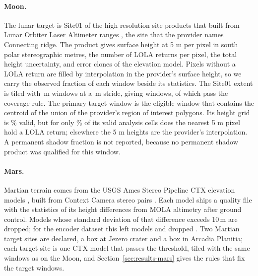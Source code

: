 \paragraph{Moon.} The lunar target is Site01 of the high resolution site products that \citet{barker2021} built from Lunar Orbiter Laser Altimeter ranges \citep{smith2010}, the site that the provider names Connecting ridge. The product gives surface
height at 5 m per pixel in south polar stereographic metres, the number of LOLA returns per pixel,
the total height uncertainty, and \ConfigClones{} error clones of the elevation model. Pixels without a
LOLA return are filled by interpolation in the provider's surface height, so we carry the observed
fraction of each window beside its statistics. The Site01 extent is tiled with \ConfigWindowM\,m
windows at a \ConfigStrideM\,m stride, giving \MoonWindowsGenerated{} windows, of which
\MoonWindowsEligible{} pass the coverage rule. The primary target window is the eligible window
that contains the centroid of the union of the provider's region of interest polygons. Its height
grid is \MoonTargetValidPct\% valid, but for only \MoonTargetObservedPct\% of its valid analysis cells does the nearest 5 m pixel hold a LOLA return; elsewhere the 5 m heights are the provider's interpolation. A permanent shadow fraction is not reported,
because no permanent shadow product was qualified for this window.

\paragraph{Mars.} Martian terrain comes from the USGS Ames Stereo Pipeline CTX elevation models
\citep{laura2021,beyer2018}, built from Context Camera stereo pairs \citep{malin2007}. Each model
ships a quality file with the statistics of its height differences from MOLA altimetry \citep{smith2001} after ground control. Models whose standard deviation of that difference exceeds 10\,m are dropped; for the encoder dataset this left \MarsDtmsUsed{} models and dropped \MarsDtmsDropped. Two Martian target sites are declared, a box at Jezero crater and a box in Arcadia Planitia; each target site is one CTX model that passes the threshold, tiled with the same windows as on the Moon, and Section~\ref{sec:results-mars} gives the rules that fix the target windows.

